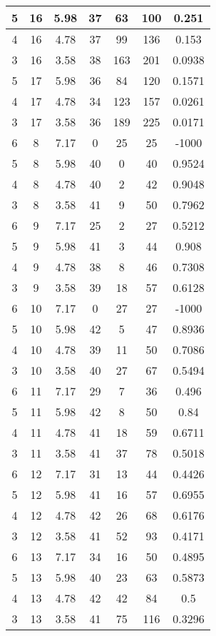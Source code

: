 \documentclass[letterpaper, 12pt]{article}
\begin{document}
\begin{longtable}{|c|c|c|c|c|c|c|}
\hline
5 & 16 & 5.98 & 37 & 63 & 100 & 0.251 \\
\hline
4 & 16 & 4.78 & 37 & 99 & 136 & 0.153 \\
\hline
3 & 16 & 3.58 & 38 & 163 & 201 & 0.0938 \\
\hline
5 & 17 & 5.98 & 36 & 84 & 120 & 0.1571 \\
\hline
4 & 17 & 4.78 & 34 & 123 & 157 & 0.0261 \\
\hline
3 & 17 & 3.58 & 36 & 189 & 225 & 0.0171 \\
\hline
6 & 8 & 7.17 & 0 & 25 & 25 & -1000 \\
\hline
5 & 8 & 5.98 & 40 & 0 & 40 & 0.9524 \\
\hline
4 & 8 & 4.78 & 40 & 2 & 42 & 0.9048 \\
\hline
3 & 8 & 3.58 & 41 & 9 & 50 & 0.7962 \\
\hline
6 & 9 & 7.17 & 25 & 2 & 27 & 0.5212 \\
\hline
5 & 9 & 5.98 & 41 & 3 & 44 & 0.908 \\
\hline
4 & 9 & 4.78 & 38 & 8 & 46 & 0.7308 \\
\hline
3 & 9 & 3.58 & 39 & 18 & 57 & 0.6128 \\
\hline
6 & 10 & 7.17 & 0 & 27 & 27 & -1000 \\
\hline
5 & 10 & 5.98 & 42 & 5 & 47 & 0.8936 \\
\hline
4 & 10 & 4.78 & 39 & 11 & 50 & 0.7086 \\
\hline
3 & 10 & 3.58 & 40 & 27 & 67 & 0.5494 \\
\hline
6 & 11 & 7.17 & 29 & 7 & 36 & 0.496 \\
\hline
5 & 11 & 5.98 & 42 & 8 & 50 & 0.84 \\
\hline
4 & 11 & 4.78 & 41 & 18 & 59 & 0.6711 \\
\hline
3 & 11 & 3.58 & 41 & 37 & 78 & 0.5018 \\
\hline
6 & 12 & 7.17 & 31 & 13 & 44 & 0.4426 \\
\hline
5 & 12 & 5.98 & 41 & 16 & 57 & 0.6955 \\
\hline
4 & 12 & 4.78 & 42 & 26 & 68 & 0.6176 \\
\hline
3 & 12 & 3.58 & 41 & 52 & 93 & 0.4171 \\
\hline
6 & 13 & 7.17 & 34 & 16 & 50 & 0.4895 \\
\hline
5 & 13 & 5.98 & 40 & 23 & 63 & 0.5873 \\
\hline
4 & 13 & 4.78 & 42 & 42 & 84 & 0.5 \\
\hline
3 & 13 & 3.58 & 41 & 75 & 116 & 0.3296 \\

\end{longtable}
\end{document}
